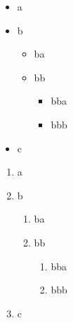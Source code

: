 \documentclass[aspectratio=169]{beamer}
\begin{document}
\begin{frame}

  \begin{itemize}
    \item a
    \item b
      \begin{itemize}
        \item ba
        \item bb
          \begin{itemize}
            \item bba
            \item bbb
          \end{itemize}
      \end{itemize}
    \item c
  \end{itemize}

  \begin{enumerate}
    \item a
    \item b
      \begin{enumerate}
        \item ba
        \item bb
          \begin{enumerate}
            \item bba
            \item bbb
          \end{enumerate}
      \end{enumerate}
    \item c
  \end{enumerate}
\end{frame}


\end{document}
